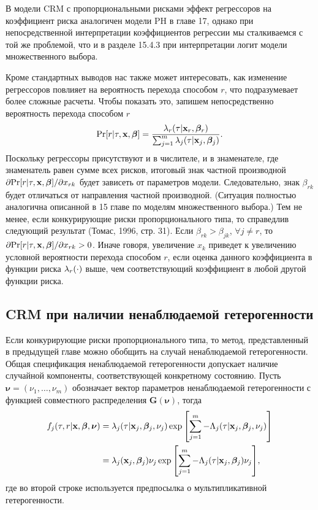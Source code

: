 \noindent
В модели CRM с пропорциональными рисками эффект регрессоров на коэффициент риска аналогичен модели PH в главе 17, %
однако при непосредственной интерпретации коэффициентов регрессии мы сталкиваемся с той же проблемой, что и в разделе 15.4.3 %
при интерпретации логит модели множественного выбора. %

Кроме стандартных выводов нас также может интересовать, как изменение регрессоров повлияет на вероятность перехода способом $r$, что подразумевает более сложные расчеты. Чтобы показать это, запишем непосредственно вероятность перехода способом $r$
    \begin{align}\label{eq:19.12}
    \mathrm{Pr} [r|\tau,\mathbf{x},\bm{\beta}] = \frac{\lambda_r(\tau|\mathbf{x}_r,\bm{\beta}_r)}{\sum^{m}_{j=1} \lambda_j(\tau|\mathbf{x}_j,\bm{\beta}_j)}.
    \end{align}
Поскольку регрессоры присутствуют и в числителе, и в знаменателе, где знаменатель равен сумме всех рисков, итоговый знак частной производной $\partial\mathrm{Pr}[r|\tau, \mathbf{x}, \bm{\beta}] / \partial x_{rk}$ будет зависеть от параметров модели. Следовательно, знак $\beta_{rk}$ будет отличаться от направления частной производной. (Ситуация полностью аналогична описанной в 15 %
главе по моделям множественного выбора.) Тем не менее, если конкурирующие риски пропорционального типа, то справедлив следующий результат (Томас, 1996, стр. 31). Если $\beta_{rk} > \beta_{jk}$, $\forall j \ne r$, то $\partial \mathrm{Pr}[r | \tau, \mathbf{x}, \bm{\beta}] / \partial x_{rk} > 0$. Иначе говоря, увеличение $x_k$ приведет к увеличению условной вероятности перехода способом $r$, если оценка данного коэффициента в функции риска $\lambda_r(\cdot)$ выше, чем соответствующий коэффициент в любой другой функции риска.


\subsection{CRM при наличии ненаблюдаемой гетерогенности}\label{sec:19.2.5}

\noindent
Если конкурирующие риски пропорционального типа, то метод, представленный в предыдущей главе можно обобщить на случай ненаблюдаемой гетерогенности. Общая спецификация ненаблюдаемой гетерогенности допускает наличие случайной компоненты, соответствующей конкретному состоянию. Пусть $\bm{\nu} = (\nu_1, \ldots , \nu_m)$ обозначает вектор параметров ненаблюдаемой гетерогенности с функцией совместного распределения $\bm{G}(\bm{\nu})$, тогда
    \begin{align}
    f_j(\tau,r| \mathbf{x}, \bm{\beta}, \bm{\nu}) &= \lambda_j(\tau|\mathbf{x}_j,\bm{\beta}_j,\nu_j) \exp{\left[ \sum^{m}_{j=1} -\Lambda_j(\tau|\mathbf{x}_j,\bm{\beta}_j,\nu_j) \right]} \notag \\
    &= \lambda_j(\mathbf{x}_j,\bm{\beta}_j)\nu_j \exp{\left[ \sum^{m}_{j=1} -\Lambda_j(\tau|\mathbf{x}_j,\bm{\beta}_j)\nu_j \right]}, \notag
    \end{align}
где во второй строке используется предпосылка о мультипликативной гетерогенности.

